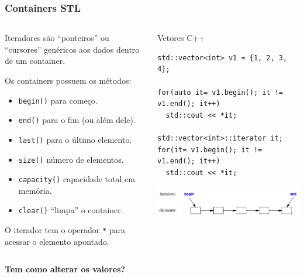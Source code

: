 \documentclass[xcolor={usenames,dvipsnames},10pt,presentation,aspectratio=169]{beamer}
\begin{document}
\begin{frame}[fragile]
  \frametitle{Containers STL}
  \vspace{-2mm}
    \begin{columns}
      \begin{column}{0.5\textwidth}
        Iteradores são ``ponteiros'' ou ``cursores'' genéricos aos dados dentro de um container.

        Os containers possuem os métodos:
        \begin{itemize}
           \item \texttt{begin()} para começo.
           \item \texttt{end()} para o fim (ou além dele). 
           \item \texttt{last()} para o último elemento.
          \item \texttt{size()} número de elementos.
          \item \texttt{capacity()} capacidade total em memória.
          \item \texttt{clear()} ``limpa'' o container.
        \end{itemize}
        O iterador tem o operador \texttt{*} para acessar o elemento apontado.
     \end{column}
      \begin{column}{0.5\textwidth}
\begin{block}{Vetores C++}
\begin{lstlisting}
std::vector<int> v1 = {1, 2, 3, 4};

for(auto it= v1.begin(); it != v1.end(); it++)
  std::cout << *it;

std::vector<int>::iterator it;
for(it= v1.begin(); it != v1.end(); it++)
  std::cout << *it;
\end{lstlisting}
\end{block}
      \begin{center}
      \includegraphics[width=\textwidth]{iterator.png}
      \end{center}
      \end{column}
    \end{columns}
  \begin{center}
  \alert{\large \textbf{Tem como alterar os valores?}}
  \end{center}
\end{frame}
\end{document}
